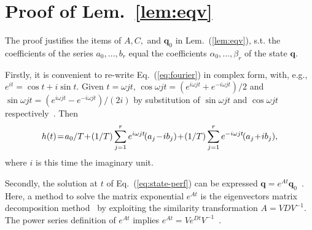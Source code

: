 \documentclass[letterpaper,10pt,journal,twoside]{IEEEtran}
\theoremstyle{definition}
\begin{document}
\section{Proof of Lem.~\ref{lem:eqv}}
\label{app:proof-eqv}{\small

The proof justifies the items of $A, C,$ and $\mathbf{q}_0$ in Lem.~(\ref{lem:eqv}), s.t. the coefficients of the series $a_0,\dots,b_r$ equal the coefficients $\alpha_0,\dots,\beta_r$ of the state $\mathbf{q}$.

Firstly, it is convenient to re-write Eq.~(\ref{eq:fourier}) in complex form, with, e.g., $e^{it}=\cos{t}+i\sin{t}$. Given $t=\omega jt$, $\cos{\omega jt}=(e^{i\omega jt}+e^{-i\omega jt})/2$ and $\sin{\omega jt}=(e^{i\omega jt}-e^{-i\omega jt})/(2i)$ by substitution of $\sin{\omega jt}$ and $\cos{\omega jt}$ respectively~\cite{kuo1967automatic}. Then
\vspace*{-.8ex}\begin{equation}\label{eq:proof-complex}\vspace*{-.8ex}
  h(t)\hspace*{-.4ex}=\hspace*{-.4ex}a_0/T\hspace*{-.4ex}+\hspace*{-.4ex}(1/T)\sum_{j=1}^{r}{e^{i\omega jt}\hspace*{-.3ex}(a_j\hspace*{-.4ex}-\hspace*{-.4ex}ib_j)}\hspace*{-.4ex}+\hspace*{-.4ex}(1/T)\sum_{j=1}^{r}{e^{-i\omega jt}\hspace*{-.3ex}(a_j\hspace*{-.4ex}+\hspace*{-.4ex}ib_j)},\vspace*{-.8ex}
\end{equation}
where $i$ is this time the imaginary unit. 

Secondly, the solution at $t$ of Eq.~(\ref{eq:state-perf}) can be expressed $\mathbf{q}=e^{At}\mathbf{q}_0$~\cite{ogata2002modern}. %
Here, a method to solve the matrix exponential $e^{At}$ is the eigenvectors matrix decomposition method~\cite{moler2003nineteen} by exploiting the similarity transformation $A=VDV^{-1}$. The power series definition of $e^{At}$ implies $e^{At}=Ve^{Dt}V^{-1}$~\cite{moler2003nineteen}. 

}
\end{document}
